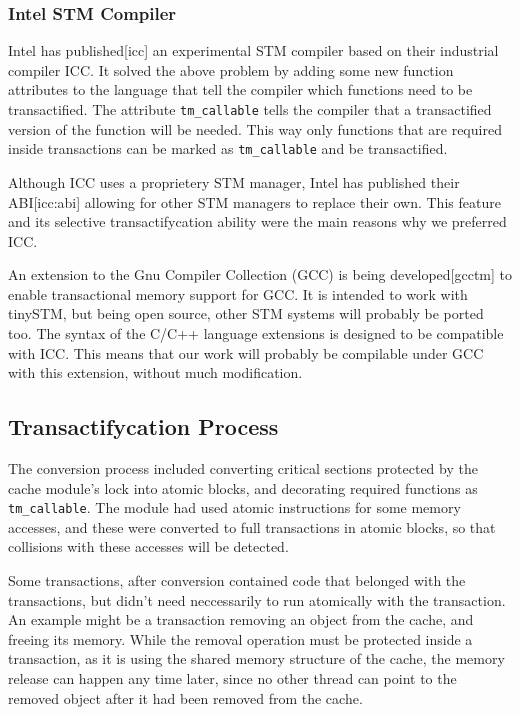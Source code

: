 \documentclass[preprint,natbib,11pt]{sigplanconf}
\begin{document}
\subsubsection{Intel STM Compiler}
Intel has published[icc] an experimental STM compiler based on their industrial compiler ICC. It solved the above problem by adding some new function attributes to the language that tell the compiler which functions need to be transactified. The attribute {\tt tm\_callable} tells the compiler that a transactified version of the function will be needed. This way only functions that are required inside transactions can be marked as {\tt tm\_callable} and be transactified.

Although ICC uses a proprietery STM manager, Intel has published their ABI[icc:abi] allowing for other STM managers to replace their own. This feature and its selective transactifycation ability were the main reasons why we preferred ICC.

An extension to the Gnu Compiler Collection (GCC) is being developed[gcctm] to enable transactional memory support for GCC. It is intended to work with tinySTM, but being open source, other STM systems will probably be ported too. The syntax of the C/C++ language extensions is designed to be compatible with ICC. This means that our work will probably be compilable under GCC with this extension, without much modification.

\subsection{Transactifycation Process}
The conversion process included converting critical sections protected by the cache module's lock into atomic blocks, and decorating required functions as {\tt tm\_callable}. The module had used atomic instructions for some memory accesses, and these were converted to full transactions in atomic blocks, so that collisions with these accesses will be detected.

Some transactions, after conversion contained code that belonged with the transactions, but didn't need neccessarily to run atomically with the transaction. An example might be a transaction removing an object from the cache, and freeing its memory. While the removal operation must be protected inside a transaction, as it is using the shared memory structure of the cache, the memory release can happen any time later, since no other thread can point to the removed object after it had been removed from the cache. 
\end{document}
